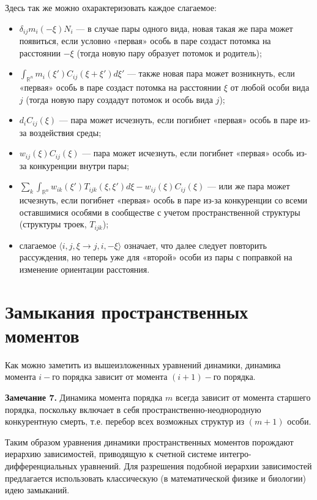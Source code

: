 Здесь так же можно охарактеризовать каждое слагаемое:
\begin{itemize}
	\item $ \delta_{ij}m_{i}(-\xi)N_{i} $ --- в случае пары одного вида, новая такая же пара может появиться, если условно «первая» особь в паре создаст потомка на расстоянии $ -\xi $ (тогда новую пару образует потомок и родитель);
	
	\item  $ \int_{\mathbb{\mathbb{R}}^{n}}m_{i}(\xi')C_{ij}(\xi+\xi')d\xi' $ --- также новая пара может возникнуть, если «первая» особь в паре создаст потомка на расстоянии $ \xi $ от любой особи вида $ j $ (тогда новую пару создадут потомок и особь вида $ j $);
	
	\item $ d_{i}C_{ij}(\xi) $ --- пара может исчезнуть, если погибнет «первая» особь в паре из-за воздействия среды;
	
	\item $ w_{ij}(\xi)C_{ij}(\xi) $ --- пара может исчезнуть, если погибнет «первая» особь из-за конкуренции внутри пары;
	
	\item  $ \sum_{k}\int_{\mathbb{\mathbb{R}}^{n}}w_{ik}(\xi')T_{ijk}(\xi,\xi')d\xi-w_{ij}(\xi)C_{ij}(\xi) $ --- или же пара может исчезнуть, если погибнет «первая» особь в паре из-за конкуренции со всеми оставшимися особями в сообществе с учетом пространственной структуры (структуры троек, $ T_{ijk} $);
	
	\item слагаемое $ \langle i,j,\xi\to j,i,-\xi\rangle $ означает, что далее следует повторить рассуждения, но теперь уже для «второй» особи из пары с поправкой на изменение ориентации расстояния.
\end{itemize}

\section{Замыкания пространственных моментов}

Как можно заметить из вышеизложенных уравнений динамики, динамика момента $ i- $го порядка зависит от момента $ (i+1)- $го порядка.

\textbf{Замечание 7.} Динамика момента порядка $ m $ всегда зависит от момента старшего порядка, поскольку включает в себя пространственно-неоднородную конкурентную смерть, т.е. перебор всех возможных структур из $ \left(m+1\right) $ особи. 

Таким образом уравнения динамики пространственных моментов порождают иерархию зависимостей, приводящую к счетной системе интегро-дифференциальных уравнений. Для разрешения подобной иерархии зависимостей предлагается использовать классическую (в математической физике и биологии) идею замыканий.

